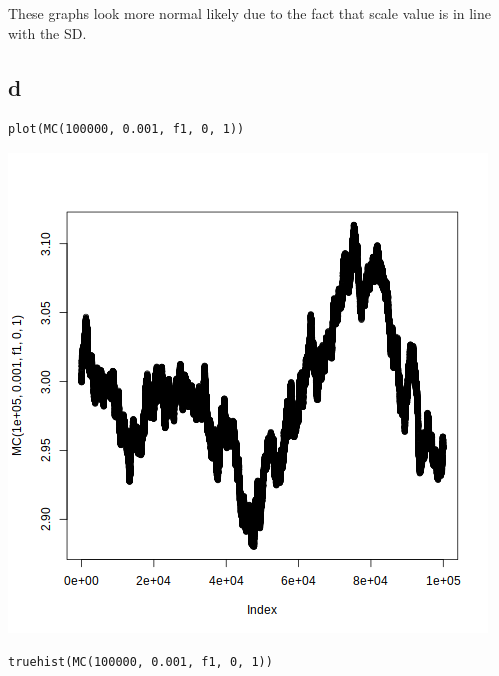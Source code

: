 \documentclass[11pt]{article}
\begin{document}
These graphs look more normal likely due to the fact that scale value is in line with the SD.

\subsection*{d}
\label{sec:org653339d}

\begin{verbatim}
plot(MC(100000, 0.001, f1, 0, 1))

\end{verbatim}

\begin{center}
\includegraphics[width=.9\linewidth]{figy2.png}
\end{center}

\begin{verbatim}
truehist(MC(100000, 0.001, f1, 0, 1))

\end{verbatim}
\end{document}
